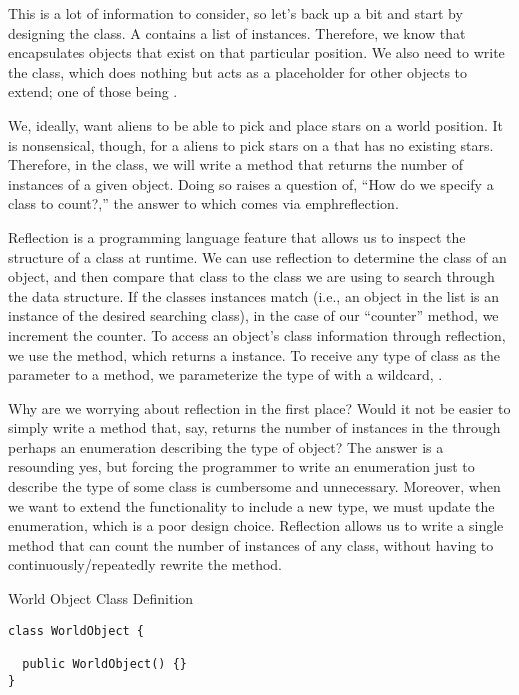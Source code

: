 This is a lot of information to consider, so let's back up a bit and start by designing the  class. A  contains a list of  instances. Therefore, we know that  encapsulates objects that exist on that particular position. We also need to write the  class, which does nothing but acts as a placeholder for other objects to extend; one of those being .

We, ideally, want aliens to be able to pick and place stars on a world position. It is nonsensical, though, for a aliens to pick stars on a  that has no existing stars. Therefore, in the  class, we will write a method that returns the number of instances of a given object. Doing so raises a question of, ``How do we specify a class to count?,'' the answer to which comes via emph{reflection}. 

Reflection is a programming language feature that allows us to inspect the structure of a class at runtime. We can use reflection to determine the class of an object, and then compare that class to the class we are using to search through the data structure. If the classes instances match (i.e., an object in the list is an instance of the desired searching class), in the case of our ``counter'' method, we increment the counter. To access an object's class information through reflection, we use the  method, which returns a  instance. To receive any type of class as the parameter to a method, we parameterize the type of  with a wildcard, .

Why are we worrying about reflection in the first place? Would it not be easier to simply write a method that, say, returns the number of  instances in the  through perhaps an enumeration describing the type of object? The answer is a resounding yes, but forcing the programmer to write an enumeration just to describe the type of some class is cumbersome and unnecessary. Moreover, when we want to extend the functionality to include a new type, we must update the enumeration, which is a poor design choice. Reflection allows us to write a single method that can count the number of instances of any class, without having to continuously/repeatedly rewrite the method.

\begin{cl}{World Object Class Definition}
\begin{lstlisting}[language=MyJava]
class WorldObject {

  public WorldObject() {}
}
\end{lstlisting}
\end{cl}

